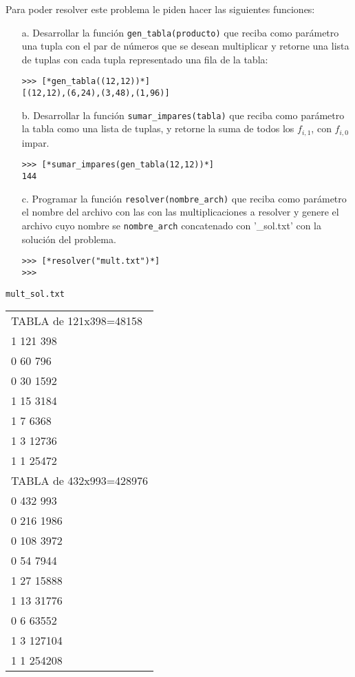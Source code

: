 Para poder resolver este problema le piden hacer las siguientes funciones:

\begin{itemize}
    \item[a.] Desarrollar la función \texttt{gen\_tabla(producto)} que reciba como parámetro una tupla con el par de números que se desean multiplicar y retorne una lista de tuplas con cada tupla representado una fila de la tabla:
    
    \begin{lstlisting}[style=consola]
>>> [*gen_tabla((12,12))*]
[(12,12),(6,24),(3,48),(1,96)]
    \end{lstlisting}

    \item[b.] Desarrollar la función \texttt{sumar\_impares(tabla)} que reciba como parámetro la tabla como una lista de tuplas, y retorne la suma de todos los $f_{i,1}$, con $f_{i,0}$ impar.
    \begin{lstlisting}[style=consola]
>>> [*sumar_impares(gen_tabla(12,12))*]
144
    \end{lstlisting}

    \item[c.] Programar la función \texttt{resolver(nombre\_arch)} que reciba como parámetro el nombre del archivo con las con las multiplicaciones a resolver y genere el archivo cuyo nombre se \texttt{nombre\_arch} concatenado con '\_sol.txt' con la solución del problema.
      \begin{lstlisting}[style=consola]
>>> [*resolver("mult.txt")*]
>>> 
    \end{lstlisting}
\end{itemize}

    \begin{center}
            \texttt{mult\_sol.txt}\\
        	\begin{tabular}{|l|}
        		\hline
TABLA de 121x398=48158\\
1	121		398\\
0	60		796\\
0	30		1592\\
1	15		3184\\
1	7		6368\\
1	3		12736\\
1	1		25472\\
TABLA de 432x993=428976\\
0	432		993\\
0	216		1986\\
0	108		3972\\
0	54		7944\\
1	27		15888\\
1	13		31776\\
0	6		63552\\
1	3		127104\\
1	1		254208\\
        		\hline
        	\end{tabular}
        \end{center}